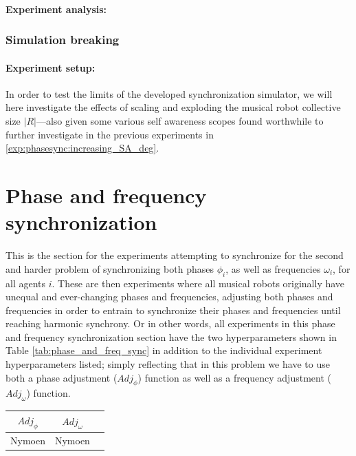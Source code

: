				\paragraph{Experiment analysis:\nl}
	
	
		\subsubsection{Simulation breaking}
		
			\paragraph{Experiment setup:\nl}
			
			In order to test the limits of the developed synchronization simulator, we will here investigate the effects of scaling and exploding the musical robot collective size $|R|$—also given some various self awareness scopes found worthwhile to further investigate in the previous experiments in \ref{exp:phasesync:increasing_SA_deg}.
	



\section{Phase and frequency synchronization}
\label{sec:phase_and_freq_sync_experiments}
This is the section for the experiments attempting to synchronize for the second and harder problem of synchronizing both phases $\phi_i$, as well as frequencies $\omega_i$, for all agents $i$. These are then experiments where all musical robots originally have unequal and ever-changing phases and frequencies, adjusting both phases and frequencies in order to entrain to synchronize their phases and frequencies until reaching harmonic synchrony. Or in other words, all experiments in this phase and frequency synchronization section have the two hyperparameters shown in Table \ref{tab:phase_and_freq_sync} in addition to the individual experiment hyperparameters listed; simply reflecting that in this problem we have to use both a phase adjustment ($Adj_{\phi}$) function as well as a frequency adjustment ($Adj_{\omega}$) function.

\begin{center}
\begin{tabular}{ |c|c|c| } 
\hline
$Adj_\phi$ & $Adj_\omega$ \\
\hline
Nymoen & Nymoen  \\
\hline
\end{tabular}
\label{tab:phase_and_freq_sync}
\end{center}


